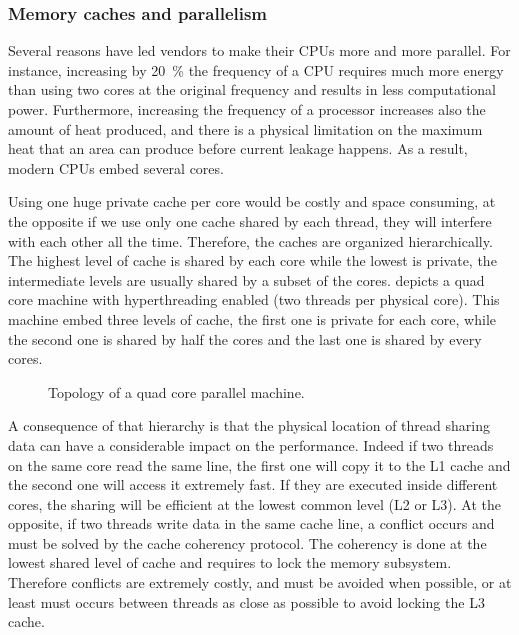 \subsubsection{Memory caches and parallelism}

Several reasons have led vendors to make their \glspl{CPU} more and more parallel.
For instance, increasing by \SI{20}{\%} the frequency of a \gls{CPU} requires much more energy than using two cores at the original frequency and results in less computational power.
Furthermore, increasing the frequency of a processor increases also the amount of heat produced, and there is a physical limitation on the maximum heat that an area can produce before current leakage happens.
As a result, modern \glspl{CPU} embed several cores.

Using one huge private cache per core would be costly and space consuming, at the opposite if we use only one cache shared by each thread, they will interfere with each other all the time.
Therefore, the caches are organized hierarchically.
The highest level of cache is shared by each core while the lowest is private, the intermediate levels are usually shared by a subset of the cores.
 depicts a quad core machine with hyperthreading enabled (two threads per physical core).
This machine embed three levels of cache, the first one is private for each core, while the second one is shared by half the cores and the last one is shared by every cores.

\begin{figure}[htb]
    \centering
    
    \caption{Topology of a quad core parallel machine.}
    \label{fig:topo-single}
\end{figure}

A consequence of that hierarchy is that the physical location of thread sharing data can have a considerable impact on the performance.
Indeed if two threads on the same core read the same line, the first one will copy it to the L1 cache and the second one will access it extremely fast.
If they are executed inside different cores, the sharing will be efficient at the lowest common level (L2 or L3).
At the opposite, if two threads write data in the same cache line, a conflict occurs and must be solved by the cache coherency protocol.
The coherency is done at the lowest shared level of cache and requires to lock the memory subsystem.
Therefore conflicts are extremely costly, and must be avoided when possible, or at least must occurs between threads as close as possible to avoid locking the L3 cache.

